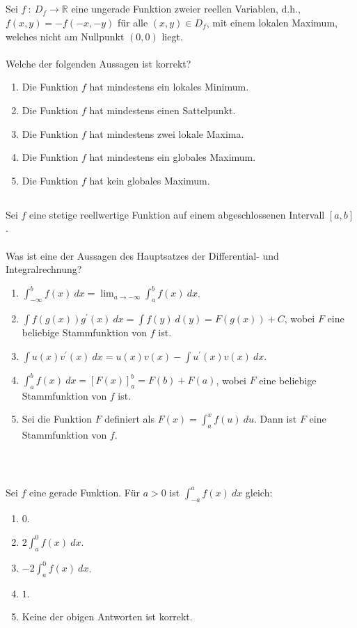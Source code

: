 \subsection*{}
Sei $ f \ : \ D_f \to \mathbb{R} $ eine ungerade Funktion zweier reellen Variablen, d.h., $f(x,y) = - f(-x,-y)$ für alle $(x,y) \in D_f$, mit einem lokalen Maximum, welches nicht am Nullpunkt $(0,0)$ liegt.\\
\\ 
Welche der folgenden Aussagen ist korrekt?
\renewcommand{\labelenumi}{(\alph{enumi})}
\begin{enumerate}
\item Die Funktion $f$ hat mindestens ein lokales Minimum.
\item Die Funktion $f$ hat mindestens einen Sattelpunkt.
\item Die Funktion $f$ hat mindestens zwei lokale Maxima.
\item Die Funktion $f$ hat mindestens ein globales Maximum.
\item Die Funktion $f$ hat kein globales Maximum.
\end{enumerate}
\newpage
\subsection*{}
Sei $f$ eine stetige reellwertige Funktion auf einem abgeschlossenen Intervall $[a,b]$.\\
\\
Was ist eine der Aussagen des Hauptsatzes der Differential- und Integralrechnung?
\renewcommand{\labelenumi}{(\alph{enumi})}
\begin{enumerate}
\item 
$\int_{-\infty}^b f(x) \ dx = 
\lim_{a \to -\infty} \int_{a}^b f(x) \ dx
$.
\item 
$\int f(g(x)) g^\prime(x) \ dx
= \int f(y) \ d(y)
= F(g(x) ) + C
$, wobei $F$ eine beliebige Stammfunktion von $f$ ist.
\item 
$\int u(x) v^\prime(x) \ dx = u(x) v(x)  - \int u^\prime(x) v(x) \ dx$.
\item 
$\int_a^b f(x) \ dx
=\left[F(x)\right]_a^b= F(b) +F(a)
$, wobei $F$ eine beliebige Stammfunktion von $f$ ist.
\item 
Sei die Funktion $F$ definiert als $F(x) = \int_a^x f(u) \ du$.
Dann ist $F$ eine Stammfunktion von $f$.
\end{enumerate}
\ \\
\subsection*{}
Sei $ f $ eine gerade Funktion.
Für $a > 0$ ist $\int_{-a}^a f(x) \ dx$ gleich:
\renewcommand{\labelenumi}{(\alph{enumi})}
\begin{enumerate}
	\item 
	$ 0 $.
	\item
	$ 2 \int_a^0 f(x) \ dx $.
	\item
	$ -2  \int_a^0 f(x) \ dx$.
	\item
	$ 1 $.
	\item
	Keine der obigen Antworten ist korrekt.
\end{enumerate}
\ \\
